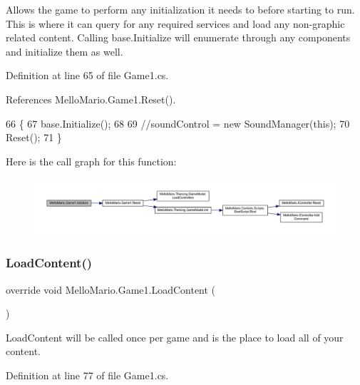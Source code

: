 Allows the game to perform any initialization it needs to before starting to run. This is where it can query for any required services and load any non-\/graphic related content. Calling base.\+Initialize will enumerate through any components and initialize them as well. 



Definition at line 65 of file Game1.\+cs.



References Mello\+Mario.\+Game1.\+Reset().


\begin{DoxyCode}
66         \{
67             base.Initialize();
68 
69             \textcolor{comment}{//soundControl = new SoundManager(this);}
70             Reset();
71         \}
\end{DoxyCode}
Here is the call graph for this function\+:
\nopagebreak
\begin{figure}[H]
\begin{center}
\leavevmode
\includegraphics[width=350pt]{classMelloMario_1_1Game1_a6fe8c72f1e2e61499a069f0440c6d75a_cgraph}
\end{center}
\end{figure}
\mbox{\label{classMelloMario_1_1Game1_a101e51a2753a38970a1317b84bab0462}} 
\subsubsection{Load\+Content()}
{\footnotesize\ttfamily override void Mello\+Mario.\+Game1.\+Load\+Content (\begin{DoxyParamCaption}{ }\end{DoxyParamCaption})\hspace{0.3cm}{\ttfamily [protected]}}



Load\+Content will be called once per game and is the place to load all of your content. 



Definition at line 77 of file Game1.\+cs.



